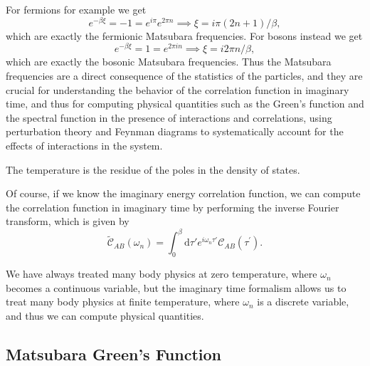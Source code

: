 For fermions for example we get
\[
    e^{- \beta \xi} = -1 = e^{i \pi} e^{2 \pi n} \implies \xi = i \pi (2n + 1) / \beta,
\]
which are exactly the fermionic Matsubara frequencies. For bosons instead we get
\[
    e^{- \beta \xi} = 1 = e^{2 \pi i n} \implies \xi = i 2 \pi n / \beta,
\]
which are exactly the bosonic Matsubara frequencies. Thus the Matsubara frequencies are a direct consequence of the statistics of the particles, and they are crucial for understanding the behavior of the correlation function in imaginary time, and thus for computing physical quantities such as the Green's function and the spectral function in the presence of interactions and correlations, using perturbation theory and Feynman diagrams to systematically account for the effects of interactions in the system.

The temperature is the residue of the poles in the density of states.

Of course, if we know the imaginary energy correlation function, we can compute the correlation function in imaginary time by performing the inverse Fourier transform, which is given by
\[
    \tilde{\mathcal{C}}_{AB}(\omega_n) = \int_0^{\beta} \mathrm{d} \tau' e^{i \omega_n \tau'} \mathcal{C}_{AB}(\tau^{\prime}).
\]

We have always treated many body physics at zero temperature, where \(\omega_n\) becomes a continuous variable, but the imaginary time formalism allows us to treat many body physics at finite temperature, where \(\omega_n\) is a discrete variable, and thus we can compute physical quantities.

\subsection{Matsubara Green's Function}

